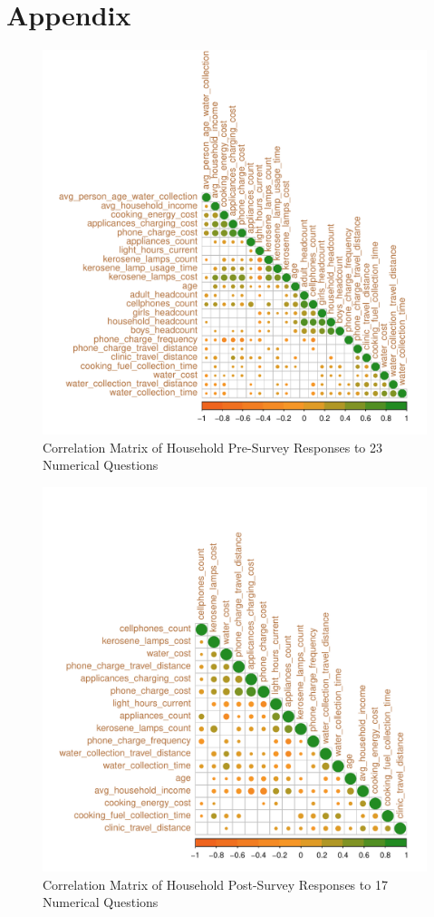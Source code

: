 \section{Appendix}
\label{sec:appendix}

\begin{figure}[ht]
    \centering
    \includegraphics[width=\textwidth]{images/hs_pre_corr_plot.pdf}
    \caption{Correlation Matrix of Household Pre-Survey Responses to 23 Numerical Questions}
    \label{fig:corr-pre}
\end{figure}

\begin{figure}
    \centering
    \includegraphics[width=\textwidth]{images/hs_post_corr_plot.pdf}
    \caption{Correlation Matrix of Household Post-Survey Responses to 17 Numerical Questions}
    \label{fig:corr-post-hh}
\end{figure}

